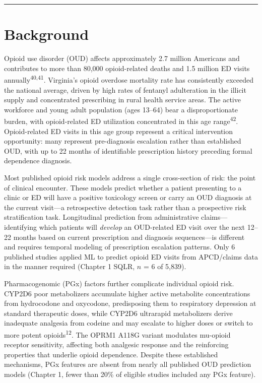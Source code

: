 \documentclass[
  12pt,
]{book}
\begin{document}
\begin{center}\rule{0.5\linewidth}{0.5pt}\end{center}

\chapter{Background}\label{sec-background}

Opioid use disorder (OUD) affects approximately 2.7 million Americans
and contributes to more than 80,000 opioid-related deaths and 1.5
million ED visits annually\textsuperscript{40,41}. Virginia's opioid
overdose mortality rate has consistently exceeded the national average,
driven by high rates of fentanyl adulteration in the illicit supply and
concentrated prescribing in rural health service areas. The active
workforce and young adult population (ages 13--64) bear a
disproportionate burden, with opioid-related ED utilization concentrated
in this age range\textsuperscript{42}. Opioid-related ED visits in this
age group represent a critical intervention opportunity: many represent
pre-diagnosis escalation rather than established OUD, with up to 22
months of identifiable prescription history preceding formal dependence
diagnosis.

Most published opioid risk models address a single cross-section of
risk: the point of clinical encounter. These models predict whether a
patient presenting to a clinic or ED will have a positive toxicology
screen or carry an OUD diagnosis at the current visit---a retrospective
detection task rather than a prospective risk stratification task.
Longitudinal prediction from administrative claims---identifying which
patients will \emph{develop} an OUD-related ED visit over the next
12--22 months based on current prescription and diagnosis sequences---is
different and requires temporal modeling of prescription escalation
patterns. Only 6 published studies applied ML to predict opioid ED
visits from APCD/claims data in the manner required (Chapter 1 SQLR,
\(n\) = 6 of 5,839).

Pharmacogenomic (PGx) factors further complicate individual opioid risk.
CYP2D6 poor metabolizers accumulate higher active metabolite
concentrations from hydrocodone and oxycodone, predisposing them to
respiratory depression at standard therapeutic doses, while CYP2D6
ultrarapid metabolizers derive inadequate analgesia from codeine and may
escalate to higher doses or switch to more potent
opioids\textsuperscript{12}. The OPRM1 A118G variant modulates mu-opioid
receptor sensitivity, affecting both analgesic response and the
reinforcing properties that underlie opioid dependence. Despite these
established mechanisms, PGx features are absent from nearly all
published OUD prediction models (Chapter 1, fewer than 20\% of eligible
studies included any PGx feature).
\end{document}
